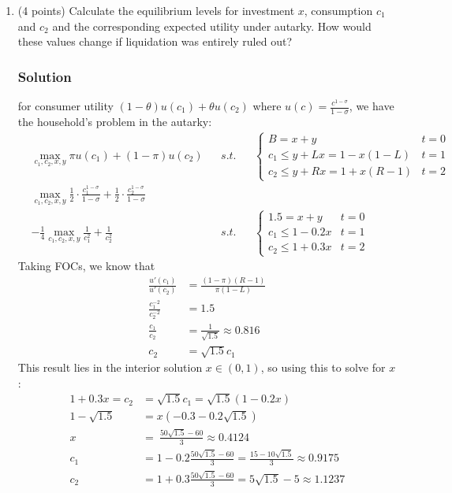 \documentclass[12pt]{article}
\begin{document}
\begin{enumerate}[label=(\alph*)]
    \item (4 points) Calculate the equilibrium levels for investment $x$, consumption $c_1$ and $c_2$ and the corresponding expected utility under autarky. How would these values change if liquidation was entirely ruled out?
    \subsubsection*{Solution}

    for consumer utility $(1-\theta)u(c_1)+\theta u(c_2)$ where $u(c) = \frac{c^{1-\sigma}}{1-\sigma}$, we have the household's problem in the autarky: 
    \begin{align*}
        &\max_{c_1, c_2, x,y} \pi u(c_1) + (1-\pi)u(c_2) && s.t. && \begin{cases}
            B  =x+y & t=0
            \\ c_1 \leq y + Lx = 1-x(1-L) & t=1
            \\ c_2 \leq y + Rx = 1+x(R-1) & t=2
        \end{cases}
        \\ &\max_{c_1, c_2, x,y} \frac{1}{2} \cdot  \frac{c_1^{1-\sigma}}{1-\sigma} + \frac{1}{2} \cdot  \frac{c_2^{1-\sigma}}{1-\sigma}
        \\ &-\frac{1}{4}\max_{c_1, c_2, x,y} \frac{1}{c_{1}^{2}}+\frac{1}{c_{2}^{2}}  && s.t. && \begin{cases}
             1.5 =x+y & t=0
            \\ c_1 \leq 1-0.2x  & t=1
            \\ c_2 \leq 1+0.3x & t=2
        \end{cases}
    \end{align*}
    Taking FOCs, we know that 
    \begin{align*}
         \frac{u'(c_1)}{u'(c_2)} &= \frac{(1-\pi)(R-1)}{\pi(1-L)} 
         \\  \frac{c_1^{-2}} {c_2^{-2}}&= 1.5
         \\ \frac{c_1}{c_2}&= \frac{1}{\sqrt{1.5}}\approx 0.816
         \\ c_2 &= \sqrt{1.5}c_1 
    \end{align*}
    This result lies in the interior solution $x\in(0,1)$, so using this to solve for $x$:
    \begin{align*}
       1+0.3x = c_2 &= \sqrt{1.5}c_1  = \sqrt{1.5}(1-0.2x)
       \\  1-\sqrt{1.5}&=x\left(-0.3-0.2\sqrt{1.5}\right)
       \\ x\ &=\ \frac{50\sqrt{1.5}-60}{3} \approx 0.4124
       \\ c_1 &= 1-0.2\frac{50\sqrt{1.5}-60}{3} = \frac{15-10\sqrt{1.5}}{3} \approx 0.9175
       \\ c_2 &= 1+0.3\frac{50\sqrt{1.5}-60}{3} = 5\sqrt{1.5}-5 \approx 1.1237
    \end{align*}


\end{enumerate}
\end{document}
